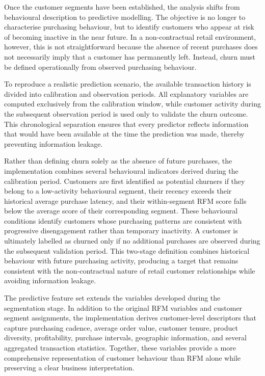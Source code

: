 \documentclass[
  12pt,
  letterpaper,
]{book}
\begin{document}
Once the customer segments have been established, the analysis shifts
from behavioural description to predictive modelling. The objective is
no longer to characterise purchasing behaviour, but to identify
customers who appear at risk of becoming inactive in the near future. In
a non-contractual retail environment, however, this is not
straightforward because the absence of recent purchases does not
necessarily imply that a customer has permanently left. Instead, churn
must be defined operationally from observed purchasing behaviour.

To reproduce a realistic prediction scenario, the available transaction
history is divided into calibration and observation periods. All
explanatory variables are computed exclusively from the calibration
window, while customer activity during the subsequent observation period
is used only to validate the churn outcome. This chronological
separation ensures that every predictor reflects information that would
have been available at the time the prediction was made, thereby
preventing information leakage.

Rather than defining churn solely as the absence of future purchases,
the implementation combines several behavioural indicators derived
during the calibration period. Customers are first identified as
potential churners if they belong to a low-activity behavioural segment,
their recency exceeds their historical average purchase latency, and
their within-segment RFM score falls below the average score of their
corresponding segment. These behavioural conditions identify customers
whose purchasing patterns are consistent with progressive disengagement
rather than temporary inactivity. A customer is ultimately labelled as
churned only if no additional purchases are observed during the
subsequent validation period. This two-stage definition combines
historical behaviour with future purchasing activity, producing a target
that remains consistent with the non-contractual nature of retail
customer relationships while avoiding information leakage.

The predictive feature set extends the variables developed during the
segmentation stage. In addition to the original RFM variables and
customer segment assignments, the implementation derives customer-level
descriptors that capture purchasing cadence, average order value,
customer tenure, product diversity, profitability, purchase intervals,
geographic information, and several aggregated transaction statistics.
Together, these variables provide a more comprehensive representation of
customer behaviour than RFM alone while preserving a clear business
interpretation.
\end{document}
